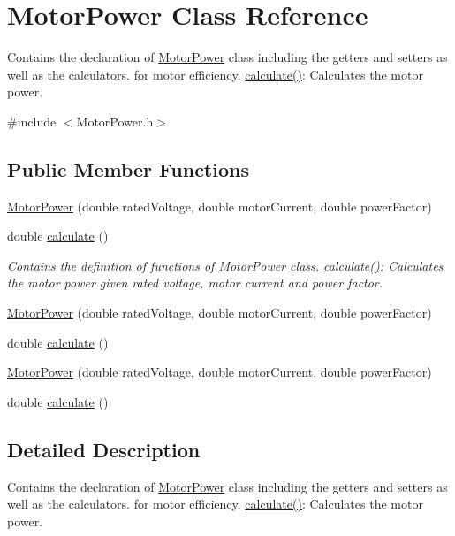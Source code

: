\hypertarget{class_motor_power}{}\section{Motor\+Power Class Reference}
\label{class_motor_power}


Contains the declaration of \hyperlink{class_motor_power}{Motor\+Power} class including the getters and setters as well as the calculators. for motor efficiency. \hyperlink{class_motor_power_a0beab572e5c46a01e474d6403ec81cf4}{calculate()}\+: Calculates the motor power.  




{\ttfamily \#include $<$Motor\+Power.\+h$>$}

\subsection*{Public Member Functions}
\begin{DoxyCompactItemize}
\item 
\hyperlink{class_motor_power_a16051e65482875fd0f70956ad8d406eb}{Motor\+Power} (double rated\+Voltage, double motor\+Current, double power\+Factor)
\item 
double \hyperlink{class_motor_power_a0beab572e5c46a01e474d6403ec81cf4}{calculate} ()
\begin{DoxyCompactList}\small\item\em Contains the definition of functions of \hyperlink{class_motor_power}{Motor\+Power} class. \hyperlink{class_motor_power_a0beab572e5c46a01e474d6403ec81cf4}{calculate()}\+: Calculates the motor power given rated voltage, motor current and power factor. \end{DoxyCompactList}\item 
\hyperlink{class_motor_power_a16051e65482875fd0f70956ad8d406eb}{Motor\+Power} (double rated\+Voltage, double motor\+Current, double power\+Factor)
\item 
double \hyperlink{class_motor_power_a0beab572e5c46a01e474d6403ec81cf4}{calculate} ()
\item 
\hyperlink{class_motor_power_a16051e65482875fd0f70956ad8d406eb}{Motor\+Power} (double rated\+Voltage, double motor\+Current, double power\+Factor)
\item 
double \hyperlink{class_motor_power_a0beab572e5c46a01e474d6403ec81cf4}{calculate} ()
\end{DoxyCompactItemize}


\subsection{Detailed Description}
Contains the declaration of \hyperlink{class_motor_power}{Motor\+Power} class including the getters and setters as well as the calculators. for motor efficiency. \hyperlink{class_motor_power_a0beab572e5c46a01e474d6403ec81cf4}{calculate()}\+: Calculates the motor power. 

